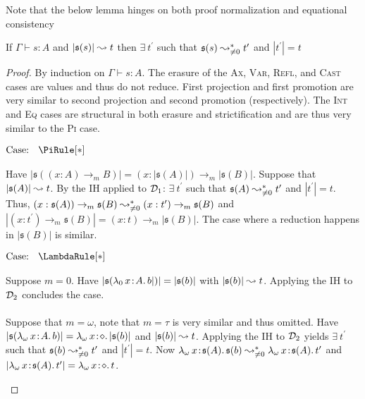 Note that the below lemma hinges on both proof normalization and equational consistency

\begin{lemma}
    \label{lem:5:strict_erase_red_step}
    If $\Gamma \vdash s : A$ and $|\mathfrak{s}(s)| \leadsto t$ then $\exists\ t^\prime$ such that $\mathfrak{s}(s) \leadsto^*_{\neq 0} t^\prime$ and $|t^\prime| = t$
\end{lemma}
\begin{proof}
    By induction on $\Gamma \vdash s : A$.
    The erasure of the \textsc{Ax}, \textsc{Var}, \textsc{Refl}, and \textsc{Cast} cases are values and thus do not reduce.
    First projection and first promotion are very similar to second projection and second promotion (respectively).
    The \textsc{Int} and \textsc{Eq} cases are structural in both erasure and strictification and are thus very similar to the \textsc{Pi} case.

    $\text{Case: }\begin{array}{c} \PiRule[*] \end{array}$
    \begin{proofcase}
        Have $|\mathfrak{s}((x : A) \to_m B)| = (x : |\mathfrak{s}(A)|) \to_m |\mathfrak{s}(B)|$.
        Suppose that $|\mathfrak{s}(A)| \leadsto t$.
        By the IH applied to $\mathcal{D}_{1}$: $\exists\ t^\prime$ such that $\mathfrak{s}(A) \leadsto^*_{\neq 0} t^\prime$ and $|t^\prime| = t$.
        Thus, $(x : \mathfrak{s}(A)) \to_m \mathfrak{s}(B) \leadsto^*_{\neq 0} (x : t^\prime) \to_m \mathfrak{s}(B)$ and $|(x : t^\prime) \to_m \mathfrak{s}(B)| = (x : t) \to_m |\mathfrak{s}(B)|$.
        The case where a reduction happens in $|\mathfrak{s}(B)|$ is similar.
    \end{proofcase}

    $\text{Case: }\begin{array}{c} \LambdaRule[*] \end{array}$
    \begin{proofcase}
        Suppose $m = 0$.
        Have $|\mathfrak{s}({\lambda_0}\, x\! : \! A.\, b|)| = |\mathfrak{s}(b)|$ with $|\mathfrak{s}(b)| \leadsto t$.
        Applying the IH to $\mathcal{D}_{2}$ concludes the case.
        \\ \\
        Suppose that $m = \omega$, note that $m = \tau$ is very similar and thus omitted.
        Have $|\mathfrak{s}({\lambda_\omega}\, x\! : \! A.\, b)| = {\lambda_\omega}\, x\! : \! \diamond.\, |\mathfrak{s}(b)|$ and $|\mathfrak{s}(b)| \leadsto t$.
        Applying the IH to $\mathcal{D}_{2}$ yields $\exists\ t^\prime$ such that $\mathfrak{s}(b) \leadsto^*_{\neq 0} t^\prime$ and $|t^\prime| = t$.
        Now ${\lambda_\omega}\, x\! : \! \mathfrak{s}(A).\, \mathfrak{s}(b) \leadsto^*_{\neq 0} {\lambda_\omega}\, x\! : \! \mathfrak{s}(A).\, t^\prime$ and $|{\lambda_\omega}\, x\! : \! \mathfrak{s}(A).\, t^\prime| = {\lambda_\omega}\, x\! : \! \diamond.\, t$.
    \end{proofcase}


\end{proof}
